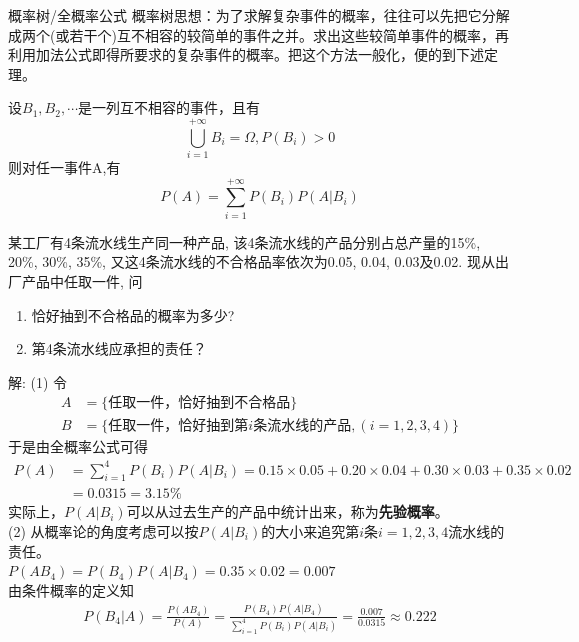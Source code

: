 \begin{frame}{概率树/全概率公式}
概率树思想：为了求解复杂事件的概率，往往可以先把它分解成两个(或若干个)互不相容的较简单的事件之并。求出这些较简单事件的概率，再利用加法公式即得所要求的复杂事件的概率。把这个方法一般化，便的到下述定理。
\begin{theorem}
	设$B_1,B_2,\cdots$是一列互不相容的事件，且有
	\[\bigcup_{i=1}^{+\infty}B_i=\Omega,P(B_i)>0 \]
	则对任一事件A,有
	\[P(A)=\sum_{i=1}^{+\infty}P(B_i)P(A|B_i) \]	
\end{theorem}
\end{frame}

\begin{frame}
\begin{example}
	某工厂有4条流水线生产同一种产品, 该4条流水线的产品分别占总产量的15\%, 20\%, 30\%, 35\%, 又这4条流水线的不合格品率依次为0.05, 0.04, 0.03及0.02. 现从出厂产品中任取一件, 问
	\begin{enumerate}
		\item 恰好抽到不合格品的概率为多少? 
		\item 第4条流水线应承担的责任？
	\end{enumerate} 
\end{example}
\end{frame}

\begin{frame}[shrink]
解: (1) 令
\begin{align*}
A&=\{\text{任取一件，恰好抽到不合格品} \}\\
B&=\{\text{任取一件，恰好抽到第$i$条流水线的产品}, (i=1,2,3,4) \}
\end{align*}
于是由全概率公式可得
\begin{align*}
P(A)&=\sum\limits_{i=1}^4P(B_i)P(A|B_i)=0.15\times 0.05+0.20\times 0.04+0.30\times 0.03+0.35\times 0.02\\
&=0.0315=3.15\%
\end{align*}
实际上，$P(A|B_i)$可以从过去生产的产品中统计出来，称为\textbf{先验概率}。\\
(2) 从概率论的角度考虑可以按$P(A|B_i)$的大小来追究第$i$条$i=1,2,3,4$流水线的责任。\\
$P(AB_4)=P(B_4)P(A|B_4)=0.35\times 0.02=0.007$\\
由条件概率的定义知
\begin{align*}
P(B_4|A)=\frac{P(AB_4)}{P(A)}=\frac{P(B_4)P(A|B_4)}{\sum\limits_{i=1}^4P(B_i)P(A|B_i)}=\frac{0.007}{0.0315}\approx 0.222
\end{align*}
\end{frame}

